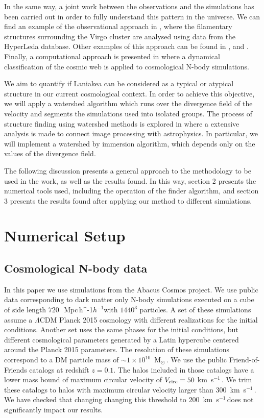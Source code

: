 \documentclass[usenatbib]{mnras}
\newcommand{\Msun}{\,{\rm M}$_{\odot}$\,}
\newcommand{\Mpch}{\,{\rm Mpc}\,\ifmmode h^{-1}\else $h^{-1}$\fi}
\newcommand{\kms}{\,{\rm km}\ s$^{-1}$\,}
\begin{document}
In the same way, a joint work between the
observations and the simulations has been carried out in order to
fully understand this pattern in the universe. We can find an example
of the observational approach in \cite{Kim_2016}, where the
filamentary structures surrounding the Virgo cluster are analysed
using data from the HyperLeda database. 
Other examples of this
approach can be found in \cite{Santiago_Bautista_2020},
\cite{van_de_Weygaert_2014} and \cite{Lares_2017}. Finally, a
computational approach is presented in
\cite{10.1111/j.1365-2966.2009.14885.x} where a dynamical
classification of the cosmic web is applied to cosmological N-body
simulations.  

We aim to quantify if Laniakea can be considered as a typical or atypical 
structure in our current cosmological context. In order to achieve
this objective, we will apply a watershed algorithm
\citep{BeucherWatershed1979} which runs over the divergence field of
the velocity and segments the simulations used into isolated
groups. The process of structure finding using watershed methods is
explored in \cite{10.1111/j.1365-2966.2007.12125.x} where a extensive
analysis is made to connect image processing with astrophysics. In
particular, we will implement a watershed by immersion algorithm,
which depends only on the values of the divergence field.  

The following discussion presents a general approach to the
methodology to be used in the work, as well as the results found. In
this way, section 2 presents the numerical tools used, including the
operation of the finder algorithm, and section 3 presents the results
found after applying our method to different simulations. 


\section{Numerical Setup}
\label{sec:numerical_setup}
\subsection{Cosmological N-body data}


In this paper we use simulations from the Abacus Cosmos project.
We use public data corresponding to dark matter only N-body
simulations executed on a cube of side length $720$\ \Mpch with
$1440^3$ particles.  
A set of these simulations assume a $\Lambda$CDM Planck 2015 cosmology
with different realizations for the initial conditions. 
Another set uses the same phases for the initial conditions, but
different cosmological parameters generated by a Latin hypercube
centered around the Planck 2015 parameters.  
The resolution of these simulations correspond to a DM particle mass
of $\sim 1 \times 10^{10}$ \Msun.
We use the public Friend-of-Friends catalogs at redshift $z=0.1$.
The halos included in those catalogs have a lower mass bound of 
maximum circular velocity of $V_{\rm circ}=50$\,\kms.
We trim these catalogs to halos with maximum circular velocity larger
than $300$ \kms. 
We have checked that changing changing this threshold to $200$ \kms does not
significantly impact our results. 
\end{document}
